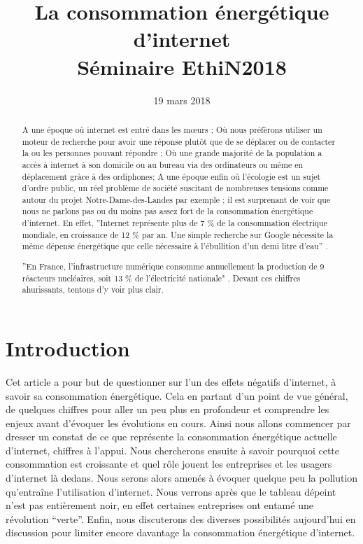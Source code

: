 \documentclass[a4paper,twocolumn,12pt]{article}
\title{\Huge \bfseries La consommation énergétique d'internet \\ \vspace{0.2cm}  \normalsize Séminaire EthiN2018}
\date{\small{19 mars 2018}}
\begin{document}
\maketitle 

\begin{abstract}

	A une époque où internet est entré dans les mœurs ; Où nous préfèrons utiliser un moteur de recherche pour avoir une réponse plutôt que de se déplacer ou de contacter la ou les personnes pouvant répondre ; Où une grande majorité de la population a accès à internet à son domicile ou au bureau via des ordinateurs ou même en déplacement gràce à des ordiphones; A une époque enfin où l'écologie est un sujet d'ordre public, un réel problème de société suscitant de nombreuses tensions comme autour du projet Notre-Dame-des-Landes par exemple ; il est surprenant de voir que nous ne parlons pas ou du moins pas assez fort de la consommation énergétique d'internet. En effet, ''Internet représente plus de 7 \% de la consommation électrique mondiale, en croissance de 12 \% par an. Une simple recherche sur Google nécessite la même dépense énergétique que celle nécessaire à l’ébullition d’un demi litre d’eau'' \cite{1}.

\newpage

	''En France, l’infrastructure numérique consomme annuellement la production de 9 réacteurs nucléaires, soit 13 \% de l’électricité nationale" \cite{1}. Devant ces chiffres ahurissants, tentons d'y voir plus clair.

\end{abstract}

\tableofcontents

\newpage

\section{Introduction}

	Cet article a pour but de questionner sur l’un des effets négatifs d’internet, à savoir sa consommation énergétique. Cela en partant d’un point de vue général, de quelques chiffres pour aller un peu plus en profondeur et comprendre les enjeux avant d’évoquer les évolutions en cours. Ainsi nous allons commencer par dresser un constat de ce que représente la consommation énergétique actuelle d’internet, chiffres à l’appui. Nous chercherons ensuite à savoir pourquoi cette consommation est croissante et quel rôle jouent les entreprises et les usagers d’internet là dedans. Nous serons alors amenés à évoquer quelque peu la pollution qu’entraîne l’utilisation d’internet. Nous verrons après que le tableau dépeint n’est pas entièrement noir, en effet certaines entreprises ont entamé une révolution “verte”. Enfin, nous discuterons des diverses possibilités aujourd’hui en discussion pour limiter encore davantage la consommation énergétique d’internet.  \\
	
\end{document}
